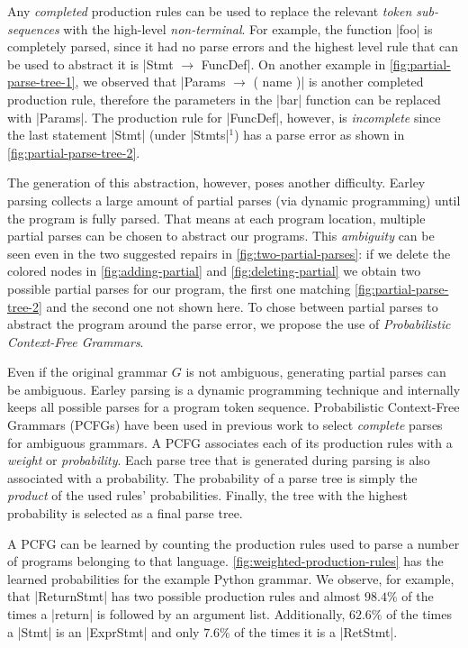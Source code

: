 Any \emph{completed} production rules can be used to replace the relevant
\emph{token sub-sequences} with the high-level \emph{non-terminal}. For example,
the function |foo| is completely parsed, since it had no parse errors and the
highest level rule that can be used to abstract it is
%
|Stmt $\rightarrow$ FuncDef|. On another example in
\autoref{fig:partial-parse-tree-1}, we observed that
%
|Params $\rightarrow$ ( name )| is another completed production rule, therefore
the parameters in the |bar| function can be replaced with |Params|. The
production rule for |FuncDef|, however, is \emph{incomplete} since the last
statement |Stmt| (under |Stmts|$^1$) has a parse error as shown in
\autoref{fig:partial-parse-tree-2}.

The generation of this abstraction, however, poses another difficulty. Earley
parsing collects a large amount of partial parses (via dynamic programming)
until the program is fully parsed. That means at each program location, multiple
partial parses can be chosen to abstract our programs. This \emph{ambiguity} can
be seen even in the two suggested repairs in \autoref{fig:two-partial-parses}:
if we delete the colored nodes in \autoref{fig:adding-partial} and
\autoref{fig:deleting-partial} we obtain two possible partial parses for our
program, the first one matching \autoref{fig:partial-parse-tree-2} and the
second one not shown here. To chose between partial parses to abstract the
program around the parse error, we propose the use of \emph{Probabilistic
Context-Free Grammars}.

Even if the original grammar $G$ is not ambiguous, generating partial parses can
be ambiguous. Earley parsing is a dynamic programming technique and internally
keeps all possible parses for a program token sequence. Probabilistic
Context-Free Grammars (PCFGs) have been used in previous work
\citep{Collins_2013, Jelinek_1992} to select \emph{complete} parses for
ambiguous grammars. A PCFG associates each of its production rules with a
\emph{weight} or \emph{probability}. Each parse tree that is generated during
parsing is also associated with a probability. The probability of a parse tree
is simply the \emph{product} of the used rules' probabilities. Finally, the tree
with the highest probability is selected as a final parse tree.

A PCFG can be learned \citep{Collins_2013} by counting the production
rules used to parse a number of programs belonging to that language.
\autoref{fig:weighted-production-rules} has the learned probabilities for the
example Python grammar. We observe, for example, that |ReturnStmt| has two
possible production rules and almost $98.4\%$ of the times a |return| is
followed by an argument list. Additionally, $62.6\%$ of the times a |Stmt| is an
|ExprStmt| and only $7.6\%$ of the times it is a |RetStmt|.

